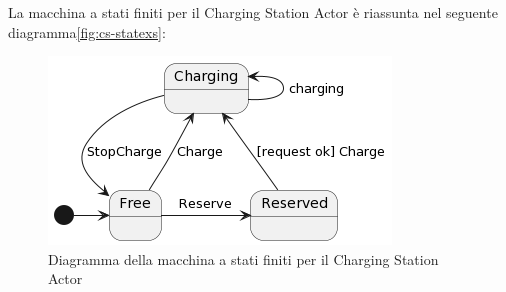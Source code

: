 La macchina a stati finiti per il Charging Station Actor è riassunta nel seguente diagramma\ref{fig:cs-statexs}:

\begin{figure}[htbp]
    \centering
    \includegraphics[width=\textwidth]{images/cs-state.png}
    \caption{Diagramma della macchina a stati finiti per il Charging Station Actor}
    \label{fig:cs-state}
\end{figure}







\newpage
